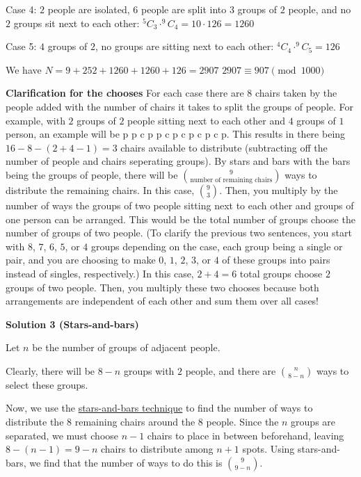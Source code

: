\begin{enumerate}
 Case 4: $2$ people are isolated, $6$ people are split into $3$ groups of $2$ people, and no $2$ groups sit next to each other: $^5C_3 \cdot ^9C_4 = 10 \cdot 126 = 1260$

 Case 5: $4$ groups of $2$, no groups are sitting next to each other: $^4C_4 \cdot ^9C_5 = 126$

 We have $N = 9 + 252 + 1260 + 1260 + 126 = 2907$
$2907 \equiv \boxed{907} \pmod{1000}$

 


 \textbf{Clarification for the chooses} For each case there are $8$ chairs taken by the people added with the number of chairs it takes to split the groups of people. For example, with $2$ groups of $2$ people sitting next to each other and $4$ groups of $1$ person, an example will be p p c p p c p c p c p c p. This results in there being $16-8-(2+4-1)=3$ chairs available to distribute (subtracting off the number of people and chairs seperating groups). By stars and bars with the bars being the groups of people, there will be $\binom{9}{\text{number of remaining chairs}}$ ways to distribute the remaining chairs. In this case, $\binom{9}{3}$. Then, you multiply by the number of ways the groups of two people sitting next to each other and groups of one person can be arranged. This would be the total number of groups choose the number of groups of two people. (To clarify the previous two sentences, you start with $8$, $7$, $6$, $5$, or $4$ groups depending on the case, each group being a single or pair, and you are choosing to make $0$, $1$, $2$, $3$, or $4$ of these groups into pairs instead of singles, respectively.) In this case, $2+4=6$ total groups choose $2$ groups of two people. Then, you multiply these two chooses because both arrangements are independent of each other and sum them over all cases!

 



\textbf{Solution 3 (Stars-and-bars)}

Let $n$ be the number of groups of adjacent people.

 Clearly, there will be $8-n$ groups with $2$ people, and there are $\binom{n}{8-n}$ ways to select these groups.

 Now, we use the \href{https://artofproblemsolving.com/wiki/index.php?title=Ball-and-urn}{stars-and-bars technique} to find the number of ways to distribute the $8$ remaining chairs around the $8$ people. Since the $n$ groups are separated, we must choose $n-1$ chairs to place in between beforehand, leaving $8-(n-1)=9-n$ chairs to distribute among $n+1$ spots. Using stars-and-bars, we find that the number of ways to do this is $\binom{9}{9-n}$.


\end{enumerate}

